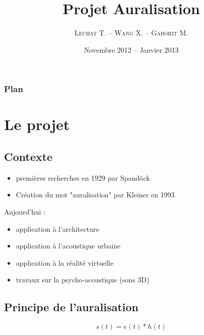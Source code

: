 \documentclass{beamer}
\title[Projet Auralisation]{Projet Auralisation}
\institute{L2 SPI TD2 -- Christophe Ayrault}
\author{\textsc{Lechat} T. -- \textsc{Wang} X. -- \textsc{Gaborit} M.}
\date{Novembre 2012 -- Janvier 2013}
\begin{document}
\begin{frame}
\titlepage
\end{frame}

\begin{frame}
\frametitle{Plan}
\tableofcontents
\end{frame}

\section{Le projet}
\subsection{Contexte}

\begin{frame}

\begin{itemize}
    \item premières recherches en 1929 par Spandöck
    \item Création du mot "auralisation" par Kleiner en 1993
\end{itemize}

Aujourd'hui :

\begin{itemize}
    \item application à l'architecture
    \item application à l'acoustique urbaine
    \item application à la réalité virtuelle
    \item travaux sur la psycho-acoustique (sons 3D)
\end{itemize}

\end{frame}

\subsection{Principe de l'auralisation}

\begin{frame}

\begin{figure}
\end{figure}

\begin{equation*}
s(t) = e(t)\ast h(t)
\end{equation*}

\end{frame}
\end{document}
